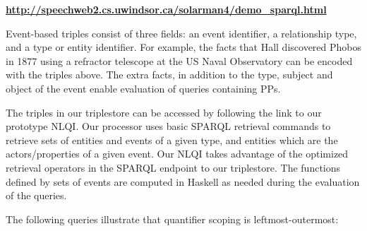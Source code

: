 \documentclass[../main.tex]{subfiles}
\begin{document}
\begin{refsection}

\begin{center}
	\textbf{\url{http://speechweb2.cs.uwindsor.ca/solarman4/demo_sparql.html}}
\end{center}


Event-based triples consist of three fields: an event identifier, a relationship type, and a type or
entity identifier. For example, the facts that Hall discovered Phobos in 1877 using a refractor
telescope at the US Naval Observatory can be encoded with the triples above.
The extra facts, in addition to the type, subject and object of the event enable evaluation of queries containing PPs.

The triples in our triplestore can be accessed by following the link to our prototype NLQI.
Our processor uses basic SPARQL retrieval commands to retrieve sets of entities and events of a given
type, and entities which are the actors/properties of a given event. Our NLQI takes
advantage of the optimized retrieval operators in the SPARQL endpoint to our triplestore. The
functions defined by sets of events are computed in Haskell as needed during the evaluation of the
queries.

The following queries illustrate that quantifier scoping is leftmost-outermost:


\end{refsection}
\end{document}
